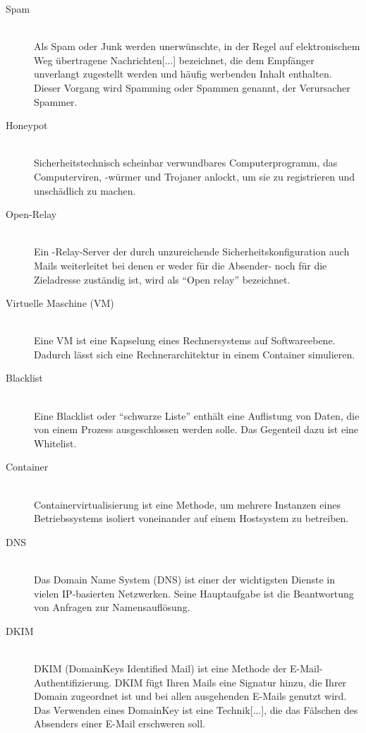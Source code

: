\documentclass[a4paper,11pt,singlespacing]{article}
\begin{document}
	\begin{description}
	\item[Spam\label{itm:Spam}]\hfill \\
		Als Spam oder Junk werden unerwünschte, in der Regel auf elektronischem Weg übertragene Nachrichten[...] bezeichnet, die dem Empfänger unverlangt zugestellt werden und häufig werbenden Inhalt enthalten. Dieser Vorgang wird Spamming oder Spammen genannt, der Verursacher Spammer.\cite{Spam}
	\item[Honeypot\label{itm:Honeypot}]\hfill \\
		Sicherheitstechnisch scheinbar verwundbares Computerprogramm, das Computerviren, -würmer und Trojaner anlockt, um sie zu registrieren und unschädlich zu machen.\cite{Honeypot}
	\item[Open-Relay\label{itm:OpenRelay}]\hfill \\
		Ein -Relay-Server der durch unzureichende Sicherheitskonfiguration auch Mails weiterleitet bei denen er weder für die Absender- noch für die Zieladresse zuständig ist, wird als "`Open relay"' bezeichnet.\cite{SMTP-Relay-Server}
	\item[Virtuelle Maschine (VM)\label{itm:VirtuelleMaschine}]\hfill \\
		Eine VM ist eine Kapselung eines Rechnersystems auf Softwareebene. Dadurch lässt sich eine Rechnerarchitektur in einem Container simulieren. \cite{VM}
	\item[Blacklist \label{itm:Blacklist}]\hfill \\
		Eine Blacklist oder "`schwarze Liste"' enthält eine Auflistung von Daten, die von einem Prozess ausgeschlossen werden solle. Das Gegenteil dazu ist eine Whitelist. \cite{Blacklist}
	\item[Container\label{itm:Container}]\hfill \\
		Containervirtualisierung ist eine Methode, um mehrere Instanzen eines Betriebssystems isoliert voneinander auf einem Hostsystem zu betreiben.\cite{Container}
	\item[DNS\label{itm:DNS}]\hfill \\
		Das Domain Name System (DNS) ist einer der wichtigsten Dienste in vielen IP-basierten Netzwerken. Seine Hauptaufgabe ist die Beantwortung von Anfragen zur Namensauflösung.\cite{DNS}
	\item[DKIM\label{itm:DKIM}]\hfill \\
		DKIM (DomainKeys Identified Mail) ist eine Methode der E-Mail-Authentifizierung. DKIM fügt Ihren Mails eine Signatur hinzu, die Ihrer Domain zugeordnet ist und bei allen ausgehenden E-Mails genutzt wird. Das Verwenden eines DomainKey ist eine Technik[...], die das Fälschen des Absenders einer E-Mail erschweren soll.\cite{DKIM}

\end{description}
\end{document}
